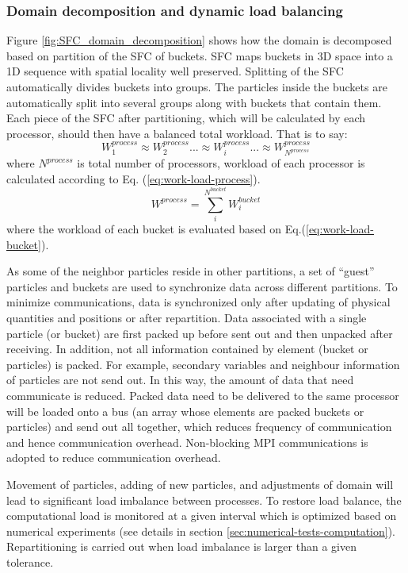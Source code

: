 \subsubsection{Domain decomposition and dynamic load balancing}
Figure \ref{fig:SFC_domain_decomposition} shows how the domain is decomposed based on partition of the SFC of buckets. SFC maps buckets in 3D space into a 1D sequence with spatial locality well preserved. Splitting of the SFC automatically divides buckets into groups. The particles inside the buckets are automatically split into several groups along with buckets that contain them. Each piece of the SFC after partitioning, which will be calculated by each processor, should then have a balanced total workload. That is to say:
\begin{equation}
W^{process}_1 \approx W^{process}_2 ... \approx W^{process}_i ...\approx W^{process}_{N^{process}}
\label{eq:work-load-balance}
\end{equation}
where $N^{process}$ is total number of processors, workload of each processor is calculated according to Eq. (\ref{eq:work-load-process}).
\begin{equation}
W^{process} = \sum_i^{N^{bucket}} W_i^{bucket}
\label{eq:work-load-process}
\end{equation}
where the workload of each bucket is evaluated based on Eq.(\ref{eq:work-load-bucket}).

As some of the neighbor particles reside in other partitions, a set of ``guest'' particles and buckets are used to synchronize data across different partitions. To minimize communications, data is synchronized only after updating of physical quantities and positions or after repartition. Data associated with a single particle (or bucket) are first packed up before sent out and then unpacked after receiving. In addition, not all information contained by element (bucket or particles) is packed. For example, secondary variables and neighbour information of particles are not send out. In this way, the amount of data that need communicate is reduced. Packed data need to be delivered to the same processor will be loaded onto a bus (an array whose elements are packed buckets or particles) and send out all together, which reduces frequency of communication and hence communication overhead. Non-blocking MPI communications is adopted to reduce communication overhead.

Movement of particles, adding of new particles, and adjustments of domain will lead to significant load imbalance between processes. To restore load balance, the computational load is monitored at a given interval which is optimized based on numerical experiments (see details in section \ref{sec:numerical-tests-computation}). Repartitioning is carried out when load imbalance is larger than a given tolerance.

